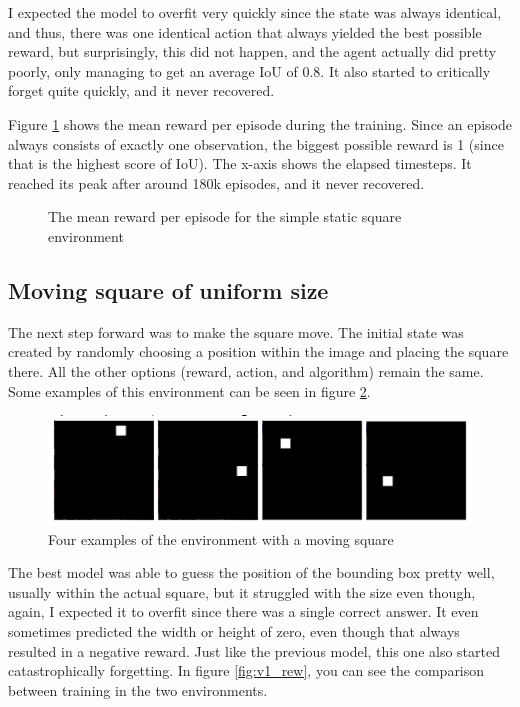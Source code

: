 \documentclass[
  digital,     %
  oneside,     %
  nosansbold,  %
  nocolorbold, %
  lof,         %
  lot,         %
]{fithesis4}
\begin{document}
I expected the model to overfit very quickly since the state was always identical, and thus, there was one identical action that always yielded the best possible reward, but surprisingly, this did not happen, and the agent actually did pretty poorly, only managing to get an average IoU of 0.8. It also started to critically forget quite quickly, and it never recovered.

Figure \ref{fig:v0_rew} shows the mean reward per episode during the training. Since an episode always consists of exactly one observation, the biggest possible reward is 1 (since that is the highest score of IoU). The x-axis shows the elapsed timesteps. It reached its peak after around 180k episodes, and it never recovered.

\begin{figure}
    \centering
    \makebox[\textwidth][c]{}
    \caption{The mean reward per episode for the simple static square environment}
    \label{fig:v0_rew}
\end{figure}


\subsection{Moving square of uniform size}
The next step forward was to make the square move. The initial state was created by randomly choosing a position within the image and placing the square there. All the other options (reward, action, and algorithm) remain the same. Some examples of this environment can be seen in figure \ref{fig:env1}.

\begin{figure}
    \includegraphics[width=1\linewidth]{env_examples/env1.png}
    \caption{Four examples of the environment with a moving square}
    \label{fig:env1}
\end{figure}

The best model was able to guess the position of the bounding box pretty well, usually within the actual square, but it struggled with the size even though, again, I expected it to overfit since there was a single correct answer. It even sometimes predicted the width or height of zero, even though that always resulted in a negative reward. Just like the previous model, this one also started catastrophically forgetting. In figure \ref{fig:v1_rew}, you can see the comparison between training in the two environments.
\end{document}
